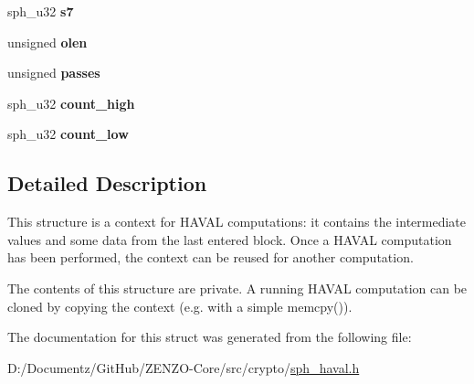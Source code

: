 \begin{DoxyCompactItemize}
sph\+\_\+u32 {\bfseries s7}
\item 
\mbox{\label{structsph__haval__context_a82f1f75b15ff4fdbdd6a59e81804ec83}} 
unsigned {\bfseries olen}
\item 
\mbox{\label{structsph__haval__context_a224cceccdc023d0dcfc2dd66f7c51a47}} 
unsigned {\bfseries passes}
\item 
\mbox{\label{structsph__haval__context_ae01455fbc5ad5c16251b76e6cd08033e}} 
sph\+\_\+u32 {\bfseries count\+\_\+high}
\item 
\mbox{\label{structsph__haval__context_aa4f80588d142c48d11ee8c2d6a3a50b7}} 
sph\+\_\+u32 {\bfseries count\+\_\+low}
\end{DoxyCompactItemize}


\subsection{Detailed Description}
This structure is a context for H\+A\+V\+AL computations\+: it contains the intermediate values and some data from the last entered block. Once a H\+A\+V\+AL computation has been performed, the context can be reused for another computation.

The contents of this structure are private. A running H\+A\+V\+AL computation can be cloned by copying the context (e.\+g. with a simple {\ttfamily memcpy()}). 

The documentation for this struct was generated from the following file\+:\begin{DoxyCompactItemize}
\item 
D\+:/\+Documentz/\+Git\+Hub/\+Z\+E\+N\+Z\+O-\/\+Core/src/crypto/\mbox{\hyperlink{sph__haval_8h}{sph\+\_\+haval.\+h}}\end{DoxyCompactItemize}
